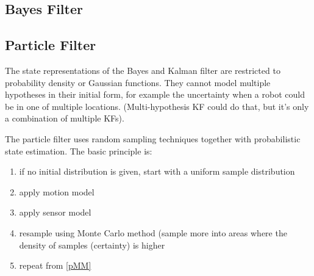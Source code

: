 \begin{multicols*}{2}
\subsection{Bayes Filter}


\subsection{Particle Filter}
The state representations of the Bayes and Kalman filter are restricted to probability density or Gaussian functions. They cannot model multiple hypotheses in their initial form, for example the uncertainty when a robot could be in one of multiple locations. (Multi-hypothesis KF could do that, but it's only a combination of multiple KFs).

The particle filter uses random sampling techniques together with probabilistic state estimation. The basic principle is:
\begin{enumerate}
	\item if no initial distribution is given, start with a uniform sample distribution
	\item apply motion model \label{pMM}
	\item apply sensor model
	\item resample using Monte Carlo method (sample more into areas where the density of samples (certainty) is higher
	\item repeat from \ref{pMM}
\end{enumerate}



\end{multicols*}

